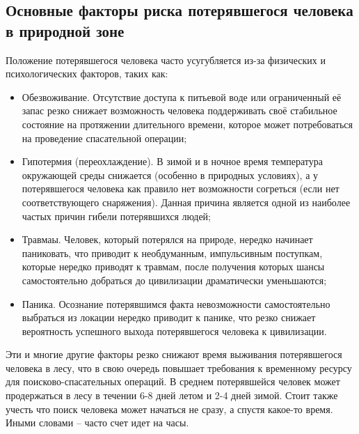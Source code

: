 \subsection{Основные факторы риска потерявшегося человека в природной зоне}

Положение потерявшегося человека часто усугубляется из-за физических и психологических факторов, таких как:

\begin{itemize}
    \item Обезвоживание. Отсутствие доступа к питьевой воде или ограниченный её запас резко снижает возможность человека поддерживать своё стабильное состояние на протяжении длительного времени, которое может потребоваться на проведение спасательной операции;
    \item Гипотермия (переохлаждение). В зимой и в ночное время температура окружающей среды снижается (особенно в природных условиях), а у потерявшегося человека как правило нет возможности согреться (если нет соответствующего снаряжения). Данная причина является одной из наиболее частых причин гибели потерявшихся людей;
    \item Травмаы. Человек, который потерялся на природе, нередко начинает паниковать, что приводит к необдуманным, импульсивным поступкам, которые нередко приводят к травмам, после получения которых шансы самостоятельно добраться до цивилизации драматически уменьшаются;
    \item Паника. Осознание потерявшимся факта невозможности самостоятельно выбраться из локации нередко приводит к панике, что резко снижает вероятность успешного выхода потерявшегося человека к цивилизации.
\end{itemize}

Эти и многие другие факторы резко снижают время выживания потерявшегося человека в лесу, что в свою очередь повышает требования к временному ресурсу для поисково-спасательных операций. В среднем потерявшейся человек может продержаться в лесу в течении 6-8 дней летом и 2-4 дней зимой. Стоит также учесть что поиск человека может начаться не сразу, а спустя какое-то время. Иными словами -- часто счет идет на часы.